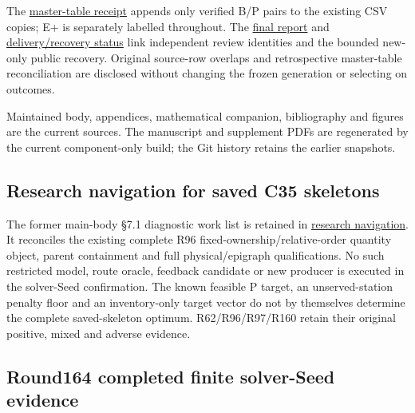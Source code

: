 \documentclass[
  american,
  11pt,
]{article}
\begin{document}
The
\href{https://github.com/yifanXovo/TailoredExact/blob/codex/round172-journal-manuscript/results/unified_exact_round163/main_table_update.json}{master-table
receipt} appends only verified B/P pairs to the existing CSV copies; E+
is separately labelled throughout. The
\href{https://github.com/yifanXovo/TailoredExact/blob/codex/round172-journal-manuscript/results/unified_exact_round163/final_report.md}{final
report} and
\href{https://github.com/yifanXovo/TailoredExact/blob/codex/round172-journal-manuscript/results/unified_exact_round163/RESUME.md}{delivery/recovery
status} link independent review identities and the bounded new-only
public recovery. Original source-row overlaps and retrospective
master-table reconciliation are disclosed without changing the frozen
generation or selecting on outcomes.

Maintained body, appendices, mathematical companion, bibliography and
figures are the current sources. The manuscript and supplement PDFs are
regenerated by the current component-only build; the Git history retains
the earlier snapshots.

\subsection{Research navigation for saved C35
skeletons}\label{research-navigation-for-saved-c35-skeletons}

The former main-body §7.1 diagnostic work list is retained in
\href{https://github.com/yifanXovo/TailoredExact/blob/codex/round172-journal-manuscript/results/unified_exact_round164/research_navigation.md}{research
navigation}. It reconciles the existing complete R96
fixed-ownership/relative-order quantity object, parent containment and
full physical/epigraph qualifications. No such restricted model, route
oracle, feedback candidate or new producer is executed in the
solver-Seed confirmation. The known feasible P target, an
unserved-station penalty floor and an inventory-only target vector do
not by themselves determine the complete saved-skeleton optimum.
R62/R96/R97/R160 retain their original positive, mixed and adverse
evidence.

\subsection{Round164 completed finite solver-Seed
evidence}\label{round164-completed-finite-solver-seed-evidence}
\end{document}
